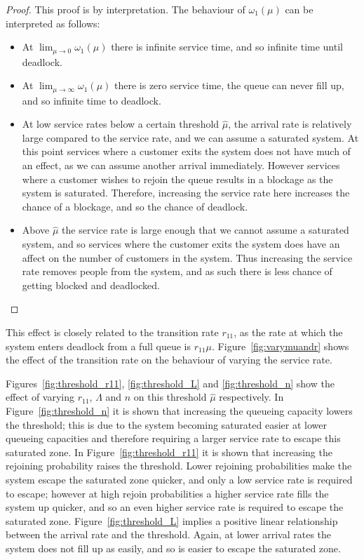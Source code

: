 \documentclass{article}
\begin{document}
\begin{proof}

This proof is by interpretation.
The behaviour of $\omega_1(\mu)$ can be interpreted as follows:
\begin{itemize}
\item At $\lim_{\mu \to 0} \omega_1 (\mu)$ there is infinite service time, and so infinite time until deadlock.
\item At $\lim_{\mu \to \infty} \omega_1 (\mu)$ there is zero service time, the queue can never fill up, and so infinite time to deadlock.
\item At low service rates below a certain threshold $\hat{\mu}$, the arrival rate is relatively large compared to the service rate, and we can assume a saturated system.
At this point services where a customer exits the system does not have much of an effect, as we can assume another arrival immediately.
However services where a customer wishes to rejoin the queue results in a blockage as the system is saturated.
Therefore, increasing the service rate here increases the chance of a blockage, and so the chance of deadlock.
\item Above $\hat{\mu}$ the service rate is large enough that we cannot assume a saturated system, and so services where the customer exits the system does have an affect on the number of customers in the system.
Thus increasing the service rate removes people from the system, and as such there is less chance of getting blocked and deadlocked.
\end{itemize}

\end{proof}

This effect is closely related to the transition rate $r_{11}$, as the rate at which the system enters deadlock from a full queue is $r_{11}\mu$.
Figure~\ref{fig:varymuandr} shows the effect of the transition rate on the behaviour of varying the service rate.

Figures~\ref{fig:threshold_r11}, \ref{fig:threshold_L} and \ref{fig:threshold_n} show the effect of varying $r_{11}$, $\Lambda$ and $n$ on this threshold $\hat{\mu}$ respectively.
In Figure~\ref{fig:threshold_n} it is shown that increasing the queueing capacity lowers the threshold; this is due to the system becoming saturated easier at lower queueing capacities and therefore requiring a larger service rate to escape this saturated zone.
In Figure~\ref{fig:threshold_r11} it is shown that increasing the rejoining probability raises the threshold.
Lower rejoining probabilities make the system escape the saturated zone quicker, and only a low service rate is required to escape; however at high rejoin probabilities a higher service rate fills the system up quicker, and so an even higher service rate is required to escape the saturated zone.
Figure~\ref{fig:threshold_L} implies a positive linear relationship between the arrival rate and the threshold.
Again, at lower arrival rates the system does not fill up as easily, and so is easier to escape the saturated zone.\\
\end{document}
